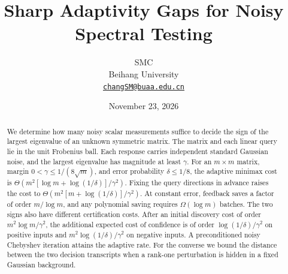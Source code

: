 \documentclass[11pt]{article}
\title{\bfseries Sharp Adaptivity Gaps for Noisy Spectral Testing}
\author{SMC\\[-.1em]{\small Beihang University}\\[-.1em]{\small\href{mailto:changSM@buaa.edu.cn}{\texttt{changSM@buaa.edu.cn}}}}
\date{\small November 23, 2026}
\theoremstyle{definition}\newtheorem{definition}[theorem]{Definition}
\theoremstyle{remark}\newtheorem{remark}[theorem]{Remark}
\begin{document}
\maketitle
\begin{abstract}
We determine how many noisy scalar measurements suffice to decide the sign of the largest eigenvalue of an unknown symmetric matrix. The matrix and each linear query lie in the unit Frobenius ball. Each response carries independent standard Gaussian noise, and the largest eigenvalue has magnitude at least \(\gamma\). For an \(m\times m\) matrix, margin \(0<\gamma\le 1/(8\sqrt m)\), and error probability \(\delta\le1/8\), the adaptive minimax cost is \(\Theta(m^2[\log m+\log(1/\delta)]/\gamma^2)\). Fixing the query directions in advance raises the cost to \(\Theta(m^2[m+\log(1/\delta)]/\gamma^2)\). At constant error, feedback saves a factor of order \(m/\log m\), and any polynomial saving requires \(\Omega(\log m)\) batches. The two signs also have different certification costs. After an initial discovery cost of order \(m^2\log m/\gamma^2\), the additional expected cost of confidence is of order \(\log(1/\delta)/\gamma^2\) on positive inputs and \(m^2\log(1/\delta)/\gamma^2\) on negative inputs. A preconditioned noisy Chebyshev iteration attains the adaptive rate. For the converse we bound the distance between the two decision transcripts when a rank-one perturbation is hidden in a fixed Gaussian background.
\end{abstract}







\appendix


\end{document}
